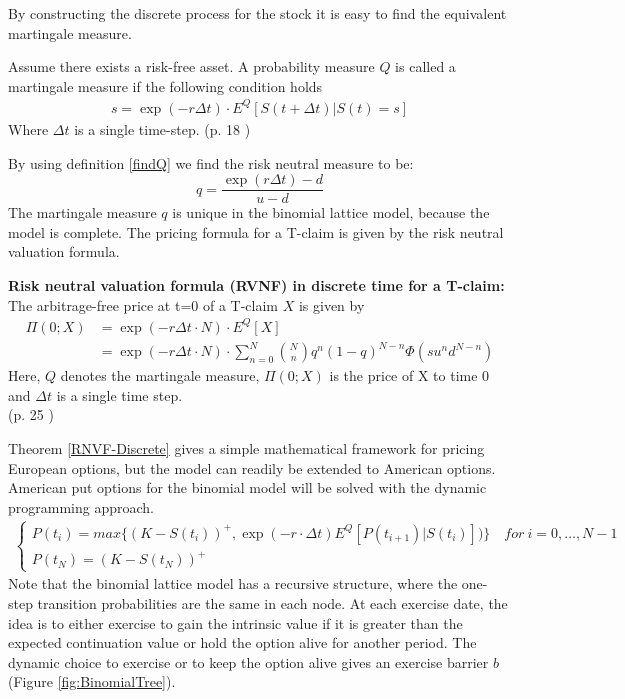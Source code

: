By constructing the discrete process for the stock it is easy to find the equivalent martingale measure. 
\begin{definition}\label{findQ}
Assume there exists a risk-free asset. A probability measure $Q$ is called a martingale measure if the following condition holds 
\begin{align*}
s= \exp(- r \Delta t) \cdot E^Q[S(t+\Delta t)|S(t)=s] 
\end{align*}
Where $\Delta t$ is a single time-step. \hfill (p. 18 \parencite{Bjork19})
\end{definition}
By using definition \ref{findQ} we find the risk neutral measure to be:
$$q=\frac{\exp(r \Delta t)-d}{u-d}$$
The martingale measure $q$ is unique in the binomial lattice model, because the model is complete. The pricing formula for a T-claim is given by the risk neutral valuation formula.
\begin{theorem}{\textbf{Risk neutral valuation formula (RVNF) in discrete time for a T-claim: }}\label{RNVF-Discrete}
The arbitrage-free price at t=0 of a T-claim $X$ is given by
\begin{align*}
\Pi(0;X)&= \exp(- r \Delta t \cdot N) \cdot E^Q[X]\\
&=\exp(- r \Delta t \cdot N) \cdot \sum_{n=0}^{N} \binom{N}{n} q^n (1-q)^{N-n} \Phi(su^n d^{N-n})
\end{align*}
Here, $Q$ denotes the martingale measure, $\Pi(0;X)$ is the price of X to time 0 and $\Delta t$ is a single time step. \\
\null \hfill (p. 25 \parencite{Bjork19})
\end{theorem}

Theorem \ref{RNVF-Discrete} gives a simple mathematical framework for pricing European options, but the model can readily be extended to American options. American put options for the binomial model will be solved with the dynamic programming approach. 
\begin{equation*}\label{BellmanEq2}
\begin{split}
\begin{cases}
          P(t_i) = max\{ (K-S(t_i))^+, \exp(-r\cdot \Delta t) E^Q[P(t_{i+1})|S(t_i)])\} \quad for \ i={0,\ldots,N-1} \\
          P(t_N) = (K-S(t_N))^+ 
\end{cases}
\end{split}
\end{equation*}
Note that the binomial lattice model has a recursive structure, where the one-step transition probabilities are the same in each node. At each exercise date, the idea is to either exercise to gain the intrinsic value if it is greater than the expected continuation value or hold the option alive for another period. The dynamic choice to exercise or to keep the option alive gives an exercise barrier $b$ (Figure \ref{fig:BinomialTree}).\\

